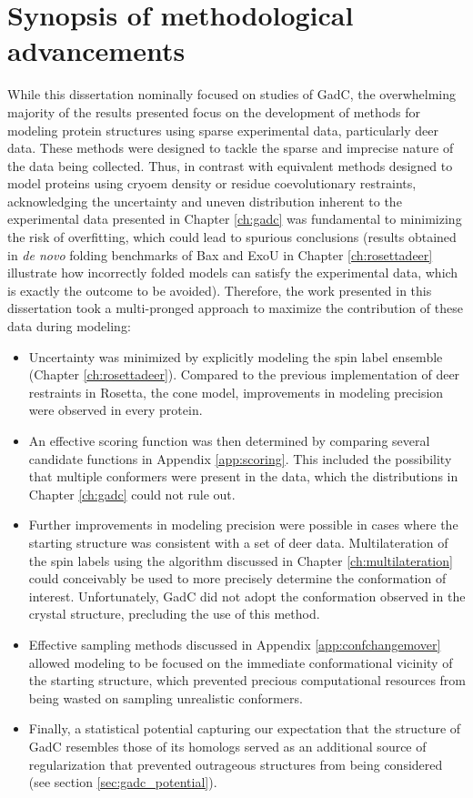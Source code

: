\section{Synopsis of methodological advancements}

While this dissertation nominally focused on studies of GadC, the overwhelming majority of the results presented focus on the development of methods for modeling protein structures using sparse experimental data, particularly \gls{deer} data. These methods were designed to tackle the sparse and imprecise nature of the data being collected. Thus, in contrast with equivalent methods designed to model proteins using \gls{cryoem} density or residue coevolutionary restraints, acknowledging the uncertainty and uneven distribution inherent to the experimental data presented in Chapter \ref{ch:gadc} was fundamental to minimizing the risk of overfitting, which could lead to spurious conclusions (results obtained in \emph{de novo} folding benchmarks of Bax and ExoU in Chapter \ref{ch:rosettadeer} illustrate how incorrectly folded models can satisfy the experimental data, which is exactly the outcome to be avoided). Therefore, the work presented in this dissertation took a multi-pronged approach to maximize the contribution of these data during modeling:

\begin{itemize}
    \item Uncertainty was minimized by explicitly modeling the spin label ensemble (Chapter \ref{ch:rosettadeer}). Compared to the previous implementation of \gls{deer} restraints in Rosetta, the \gls{cone} model, improvements in modeling precision were observed in every protein.
    \item An effective scoring function was then determined by comparing several candidate functions in Appendix \ref{app:scoring}. This included the possibility that multiple conformers were present in the data, which the distributions in Chapter \ref{ch:gadc} could not rule out.
    \item Further improvements in modeling precision were possible in cases where the starting structure was consistent with a set of \gls{deer} data. Multilateration of the spin labels using the algorithm discussed in Chapter \ref{ch:multilateration} could conceivably be used to more precisely determine the conformation of interest. Unfortunately, GadC did not adopt the conformation observed in the crystal structure, precluding the use of this method.
    \item Effective sampling methods discussed in Appendix \ref{app:confchangemover} allowed modeling to be focused on the immediate conformational vicinity of the starting structure, which prevented precious computational resources from being wasted on sampling unrealistic conformers.
    \item Finally, a statistical potential capturing our expectation that the structure of GadC resembles those of its homologs served as an additional source of regularization that prevented outrageous structures from being considered (see section \ref{sec:gadc_potential}).
\end{itemize}

